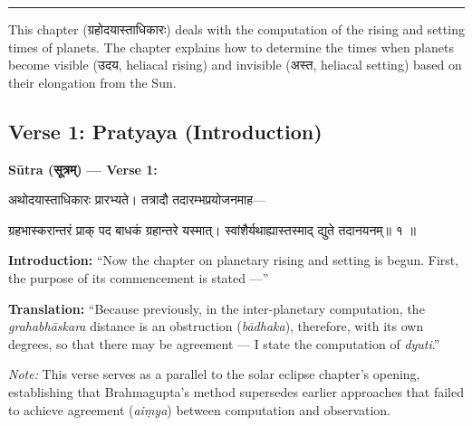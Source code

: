 \documentclass[11pt,a4paper]{article}
\newcommand{\dev}[1]{{\devanagarifont #1}}
\newenvironment{sanskritverse}{%
  \begin{center}\begin{minipage}{0.95\textwidth}
  \setlength{\leftskip}{1em}
  \setlength{\rightskip}{1em}
  \dev
}{\end{minipage}\end{center}}
\newenvironment{paracol}[1]{\begingroup}{\endgroup}
\newcommand{\switchcolumn}[1][]{%
  \ifnum#1=0\relax\else\par\nobreak\vspace{0.5em}\par\nobreak\fi%
}
\begin{document}
\begin{center}
\textcolor{rulecolor}{\rule{0.8\textwidth}{0.5pt}}
\end{center}

This chapter (\dev{ग्रहोदयास्ताधिकारः}) deals with the computation of the rising and setting times of planets. The chapter explains how to determine the times when planets become visible (\dev{उदय}, heliacal rising) and invisible (\dev{अस्त}, heliacal setting) based on their elongation from the Sun.

\subsection{Verse 1: Pratyaya (Introduction)}

\vspace{0.5em}
\noindent\textbf{Sūtra (\dev{सूत्रम्}) — Verse 1:}

\begin{paracol}{2}

\begin{sanskritverse}
अथोदयास्ताधिकारः प्रारभ्यते। तत्रादौ तदारम्भप्रयोजनमाह—
\end{sanskritverse}

\begin{sanskritverse}
ग्रहभास्करान्तरं प्राक् पद बाधकं ग्रहान्तरे यस्मात्।
स्वांशैर्यथाह्यास्तस्माद् द्युते तदानयनम्॥ १ ॥
\end{sanskritverse}

\switchcolumn

\textbf{Introduction:} ``Now the chapter on planetary rising and setting is begun. First, the purpose of its commencement is stated ---''

\textbf{Translation:} ``Because previously, in the inter-planetary computation, the \textit{grahabhāskara} distance is an obstruction (\textit{bādhaka}), therefore, with its own degrees, so that there may be agreement --- I state the computation of \textit{dyuti}.''

\textit{Note:} This verse serves as a parallel to the solar eclipse chapter's opening, establishing that Brahmagupta's method supersedes earlier approaches that failed to achieve agreement (\textit{aiṃya}) between computation and observation.

\end{paracol}
\end{document}
